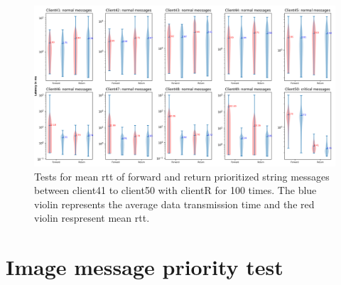 \begin{figure}
    \includegraphics[width=\textheight]{figures/appendix/priority_tests/log_violin_50clients_string_figure_5.png}\hfill 
    \caption{Tests for mean \gls{rtt} of forward and return prioritized string messages between client41 to client50 
    with clientR for 100 times. The blue violin represents the average data transmission time and the red violin 
    respresent mean \gls{rtt}.} \label{fig: priority-50clients-string-e}
\end{figure}



\section{Image message priority test}%



